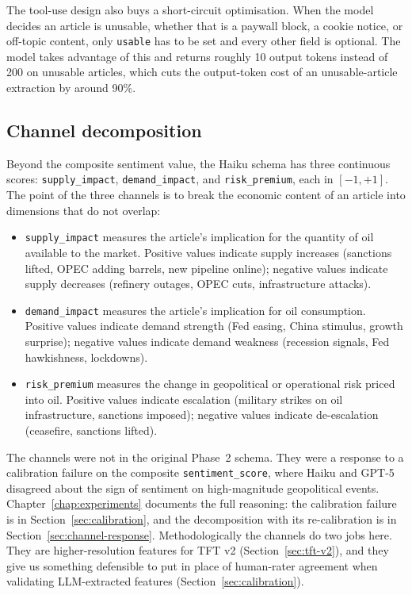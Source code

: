 The tool-use design also buys a short-circuit optimisation. When the model decides an article is unusable, whether that is a paywall block, a cookie notice, or off-topic content, only \texttt{usable} has to be set and every other field is optional. The model takes advantage of this and returns roughly 10 output tokens instead of 200 on unusable articles, which cuts the output-token cost of an unusable-article extraction by around 90\%.

\subsection{Channel decomposition}\label{sec:channel-decomposition}

Beyond the composite sentiment value, the Haiku schema has three continuous scores: \texttt{supply\_impact}, \texttt{demand\_impact}, and \texttt{risk\_premium}, each in $[-1, +1]$. The point of the three channels is to break the economic content of an article into dimensions that do not overlap:

\begin{itemize}
  \item \texttt{supply\_impact} measures the article's implication for the quantity of oil available to the market. Positive values indicate supply increases (sanctions lifted, OPEC adding barrels, new pipeline online); negative values indicate supply decreases (refinery outages, OPEC cuts, infrastructure attacks).
  \item \texttt{demand\_impact} measures the article's implication for oil consumption. Positive values indicate demand strength (Fed easing, China stimulus, growth surprise); negative values indicate demand weakness (recession signals, Fed hawkishness, lockdowns).
  \item \texttt{risk\_premium} measures the change in geopolitical or operational risk priced into oil. Positive values indicate escalation (military strikes on oil infrastructure, sanctions imposed); negative values indicate de-escalation (ceasefire, sanctions lifted).
\end{itemize}

The channels were not in the original Phase~2 schema. They were a response to a calibration failure on the composite \texttt{sentiment\_score}, where Haiku and GPT-5 disagreed about the sign of sentiment on high-magnitude geopolitical events. Chapter~\ref{chap:experiments} documents the full reasoning: the calibration failure is in Section~\ref{sec:calibration}, and the decomposition with its re-calibration is in Section~\ref{sec:channel-response}. Methodologically the channels do two jobs here. They are higher-resolution features for TFT v2 (Section~\ref{sec:tft-v2}), and they give us something defensible to put in place of human-rater agreement when validating LLM-extracted features (Section~\ref{sec:calibration}).

